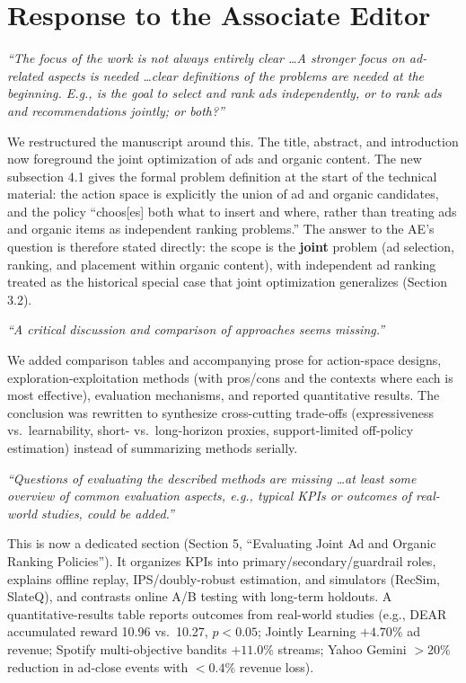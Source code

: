 \documentclass[11pt]{article}
\newenvironment{revcomment}
  {\par\smallskip\noindent\begin{list}{}{%
      \setlength{\leftmargin}{1.5em}\setlength{\rightmargin}{1em}}%
   \item\itshape\color{black!75}}
  {\end{list}\par\smallskip}
\begin{document}
\section*{Response to the Associate Editor}

\begin{revcomment}
``The focus of the work is not always entirely clear \dots A stronger focus on
ad-related aspects is needed \dots clear definitions of the problems are needed
at the beginning. E.g., is the goal to select and rank ads independently, or to
rank ads and recommendations jointly; or both?''
\end{revcomment}

We restructured the manuscript around this. The title, abstract, and
introduction now foreground the joint optimization of ads and organic content.
The new subsection 4.1 gives the formal problem definition at the start of the
technical material: the action space is explicitly the union of ad and organic
candidates, and the policy ``choos[es] both what to insert and where, rather
than treating ads and organic items as independent ranking problems.'' The
answer to the AE's question is therefore stated directly: the scope is the
\textbf{joint} problem (ad selection, ranking, and placement within organic
content), with independent ad ranking treated as the historical special case
that joint optimization generalizes (Section 3.2).

\begin{revcomment}
``A critical discussion and comparison of approaches seems missing.''
\end{revcomment}

We added comparison tables and accompanying prose for action-space designs,
exploration-exploitation methods (with pros/cons and the contexts where each is
most effective), evaluation mechanisms, and reported quantitative results. The
conclusion was rewritten to synthesize cross-cutting trade-offs (expressiveness
vs.\ learnability, short- vs.\ long-horizon proxies, support-limited off-policy
estimation) instead of summarizing methods serially.

\begin{revcomment}
``Questions of evaluating the described methods are missing \dots at least some
overview of common evaluation aspects, e.g., typical KPIs or outcomes of
real-world studies, could be added.''
\end{revcomment}

This is now a dedicated section (Section 5, ``Evaluating Joint Ad and Organic
Ranking Policies''). It organizes KPIs into primary/secondary/guardrail roles,
explains offline replay, IPS/doubly-robust estimation, and simulators (RecSim,
SlateQ), and contrasts online A/B testing with long-term holdouts. A
quantitative-results table reports outcomes from real-world studies (e.g., DEAR
accumulated reward 10.96 vs.\ 10.27, \(p<0.05\); Jointly Learning $+4.70\%$ ad
revenue; Spotify multi-objective bandits $+11.0\%$ streams; Yahoo Gemini
$>20\%$ reduction in ad-close events with $<0.4\%$ revenue loss).
\end{document}
